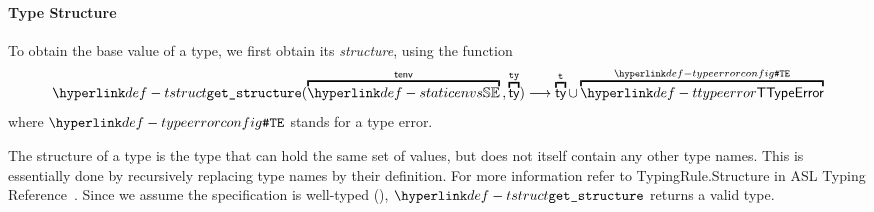 \documentclass{book}
\newcommand\vt[0]{\texttt{t}}
\begin{document}
\hypertarget{def-tstruct}{}
\paragraph{Type Structure} To obtain the base value of a type, we first obtain its \emph{structure}, using the function
\[
  \tstruct(\overname{\staticenvs}{\tenv} \aslsep \overname{\ty}{\tty}) \aslto \overname{\ty}{\vt} \cup \overname{\TTypeError}{\TypeErrorConfig}
\]
\hypertarget{def-typeerrorconfig}{}
where $\TypeErrorConfig$ stands for a type error.

The structure of a type is the type that can hold the same set of values, but does not itself
contain any other type names.
This is essentially done by recursively replacing type names by their definition.
For more information refer to TypingRule.Structure in
ASL Typing Reference~\cite{ASLTypingReference}.
%
Since we assume the specification is well-typed (),
$\tstruct$ returns a valid type.
\end{document}
